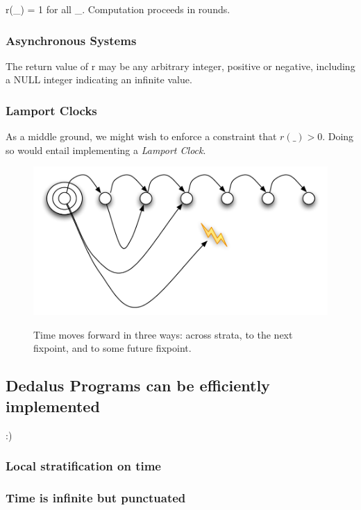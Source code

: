 \documentclass{acm_proc_article-sp-sigmod09}
\begin{document}
r(\_) = 1 for all \_.  Computation proceeds in rounds.

\subsubsection{Asynchronous Systems}

The return value of r may be any arbitrary integer, positive or negative, including a NULL integer indicating an infinite value.

\subsubsection{Lamport Clocks}

As a middle ground, we might wish to enforce a constraint that $r(\_) > 0$.  Doing so would entail implementing a \emph{Lamport Clock}.

\begin{figure}[t]
  \centering
  \includegraphics[width=0.75\linewidth]{dedalus-time.pdf}
  \label{fig:dedalus-time}
  \caption{Time moves forward in three ways: across strata, to the next fixpoint, and to some future fixpoint.}
\vspace{-8pt}
\end{figure}


\subsection{Dedalus Programs can be efficiently implemented}

:)

\subsubsection{Local stratification on time}

\subsubsection{Time is infinite but punctuated}
\end{document}
